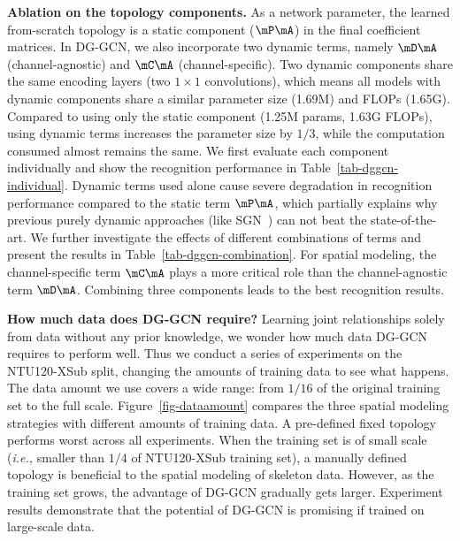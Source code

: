 \noindent
\textbf{Ablation on the topology components. }
As a network parameter, the learned from-scratch topology is a static component ($\mP\mA$) in the final coefficient matrices. 
In DG-GCN, we also incorporate two dynamic terms, namely $\mD\mA$ (channel-agnostic) and $\mC\mA$ (channel-specific). 
Two dynamic components share the same encoding layers (two $1\times 1$ convolutions), 
which means all models with dynamic components share a similar parameter size (1.69M) and FLOPs (1.65G). 
Compared to using only the static component (1.25M params, 1.63G FLOPs), 
using dynamic terms increases the parameter size by $1/3$, while the computation consumed almost remains the same. 
We first evaluate each component individually and show the recognition performance in Table~\ref{tab-dggcn-individual}. 
Dynamic terms used alone cause severe degradation in recognition performance compared to the static term $\mP\mA$, 
which partially explains why previous purely dynamic approaches (like SGN~\cite{zhang2020semantics}) can not beat the state-of-the-art. 
We further investigate the effects of different combinations of terms and present the results in Table~\ref{tab-dggcn-combination}. 
For spatial modeling, the channel-specific term $\mC\mA$ plays a more critical role than the channel-agnostic term $\mD\mA$. 
Combining three components leads to the best recognition results.

\noindent
\textbf{How much data does DG-GCN require? }  
Learning joint relationships solely from data without any prior knowledge, 
we wonder how much data DG-GCN requires to perform well. 
Thus we conduct a series of experiments on the NTU120-XSub split, changing the amounts of training data to see what happens. 
The data amount we use covers a wide range: from $1/16$ of the original training set to the full scale. 
Figure~\ref{fig-dataamount} compares the three spatial modeling strategies with different amounts of training data.  
A pre-defined fixed topology performs worst across all experiments. 
When the training set is of small scale (\emph{i.e.,} smaller than $1/4$ of NTU120-XSub training set), 
a manually defined topology is beneficial to the spatial modeling of skeleton data.
However, as the training set grows, the advantage of DG-GCN gradually gets larger. 
Experiment results demonstrate that the potential of DG-GCN is promising if trained on large-scale data. 

